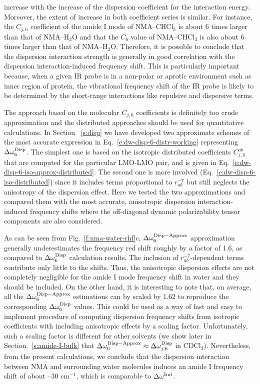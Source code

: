 \documentclass[a4paper,titlepage,twoside,fleqn,12pt]{book}
\begin{document}
\begin{refsection}
increase with the increase of the dispersion coefficient for the interaction
energy. Moreover, the extent of increase in both coefficient series
is similar. For instance, the $C_{j,6}$ coefficient of the
amide I mode of NMA--CHCl$_3$ is about 6 times larger than
that of NMA--H$_2$O and that the $C_6$ value of NMA--CHCl$_3$ is
also about 6 times larger than that of NMA--H$_2$O. Therefore,
it is possible to conclude that the dispersion interaction
strength is generally in good correlation with the dispersion
interaction\hyp{}induced frequency shift. This is particularly important
because, when a given IR probe is in a non\hyp{}polar or aprotic
environment such as inner region of protein, the vibrational
frequency shift of the IR probe is likely to be determined
by the short\hyp{}range interactions like repulsive and dispersive
terms.

The approach based on the molecular $C_{j,6}$ coefficients 
is definitely too crude approximation and the distributed approaches
should be used for quantitative calculations. 
In Section ~\ref{s:disp} we have developed two
approximate schemes of the most accurate expression in Eq.~\eqref{e:dw-disp-6-distr-working}
representing $\Delta\omega^{\rm Disp}_6$. The simplest
one is based on the isotropic distributed coefficients $C_{j,6}^{ab}$
that are computed for the particular LMO-LMO pair, and is given
in Eq.~\eqref{e:dw-disp-6-iso-approx-distributed}. 
The second one is more involved (Eq.~\eqref{e:dw-disp-6-iso-distributed}) since
it includes terms proportional to $r^{-7}_{ab}$ but still neglects the anisotropy
of the dispersion effect. Here we tested the two approximations
and compared them with the most accurate, anisotropic dispersion
interaction\hyp{}induced frequency shifts where
the off\hyp{}diagonal dynamic polarizability tensor components
are also considered.

As can be seen from Fig.~\ref{f:nma-water-rhf}c,
$\Delta \omega_{6}^{\rm Disp-Approx}$ approximation generally
underestimates the frequency red shift roughly by a factor of 1.6,
as compared to $\Delta\omega^{\rm Disp}_6$ calculation results.
The inclusion of $r^{-7}_{ab}$\hyp{}dependent terms contribute 
only little to the shifts. Thus, the anisotropic dispersion effects
are not completely negligible for the amide I mode frequency shift
in water and they should be included. On the other hand, it is interesting
to note that, on average, all the $\Delta \omega_{6}^{\rm Disp-Approx}$
estimations can by scaled by 1.62 to reproduce the corresponding $\Delta\omega^{\rm Disp}_6$
values. This could be used as a way of fast and easy to implement
procedure of computing dispersion frequency shifts from isotropic
coefficients with including anisotropic effects by a scaling factor.
Unfortunately, such a scaling
factor is different for other solvents 
(we show later in Section.~\ref{s:amide-I-bulk} that 
$\Delta \omega_{6}^{\rm Disp-Approx}\approx\Delta \omega_{j,6}^{\rm Disp}$
in CDCl$_3$). 
Nevertheless, from the present calculations, we conclude that the dispersion
interaction between NMA and surrounding water molecules
induces an amide I frequency shift of about --30 cm$^{-1}$, which is
comparable to $\Delta \omega^{\rm Ind}$.


\end{refsection}
\end{document}
